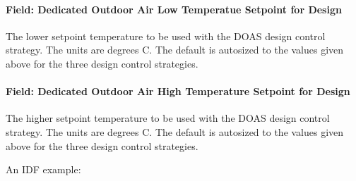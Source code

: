 \paragraph{Field: Dedicated Outdoor Air Low Temperatue Setpoint for Design}\label{field-dedicated-outdoor-air-low-temperatue-setpoint-for-design}

The lower setpoint temperature to be used with the DOAS design control strategy. The units are degrees C. The default is autosized to the values given above for the three design control strategies.

\paragraph{Field: Dedicated Outdoor Air High Temperature Setpoint for Design}\label{field-dedicated-outdoor-air-high-temperature-setpoint-for-design}

The higher setpoint temperature to be used with the DOAS design control strategy. The units are degrees C. The default is autosized to the values given above for the three design control strategies.

An IDF example:

